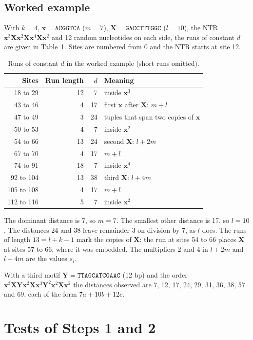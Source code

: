 \documentclass[11pt,a4paper]{article}
\begin{document}
\subsection{Worked example}
With $k=4$, $\mathbf{x}=\texttt{ACGGTCA}$ ($m=7$),
$\mathbf{X}=\texttt{GACCTTTGGC}$ ($l=10$), the NTR
$\mathbf{x}^3\mathbf{X}\mathbf{x}^2\mathbf{X}\mathbf{x}^4\mathbf{X}\mathbf{x}^2$
and 12 random nucleotides on each side, the runs of constant $d$ are given in
Table~\ref{tab:example}. Sites are numbered from 0 and the NTR starts at site 12.
\begin{table}[h]\centering
\caption{Runs of constant $d$ in the worked example (short runs omitted).}\label{tab:example}
\begin{tabular}{rrrl}
\toprule
Sites & Run length & $d$ & Meaning \\
\midrule
18 to 29 & 12 & 7 & inside $\mathbf{x}^3$ \\
43 to 46 & 4 & 17 & first $\mathbf{x}$ after $\mathbf{X}$: $m+l$ \\
47 to 49 & 3 & 24 & tuples that span two copies of $\mathbf{x}$ \\
50 to 53 & 4 & 7 & inside $\mathbf{x}^2$ \\
54 to 66 & 13 & 24 & second $\mathbf{X}$: $l+2m$ \\
67 to 70 & 4 & 17 & $m+l$ \\
74 to 91 & 18 & 7 & inside $\mathbf{x}^4$ \\
92 to 104 & 13 & 38 & third $\mathbf{X}$: $l+4m$ \\
105 to 108 & 4 & 17 & $m+l$ \\
112 to 116 & 5 & 7 & inside $\mathbf{x}^2$ \\
\bottomrule
\end{tabular}
\end{table}
The dominant distance is 7, so $m=7$. The smallest other distance is 17, so
$l=10$. The distances 24 and 38 leave remainder 3 on division by 7, as $l$
does. The runs of length $13=l+k-1$ mark the copies of $\mathbf{X}$: the run at
sites 54 to 66 places $\mathbf{X}$ at sites 57 to 66, where it was embedded.
The multipliers 2 and 4 in $l+2m$ and $l+4m$ are the values $s_i$.

With a third motif $\mathbf{Y}=\texttt{TTAGCATCGAAC}$ (12 bp) and the order
$\mathbf{x}^3\mathbf{X}\mathbf{Y}\mathbf{x}^2\mathbf{X}\mathbf{x}^3\mathbf{Y}^2\mathbf{x}^2\mathbf{X}\mathbf{x}^2$
the distances observed are 7, 12, 17, 24, 29, 31, 36, 38, 57 and 69, each of the
form $7a+10b+12c$.

\section{Tests of Steps 1 and 2}
\end{document}
